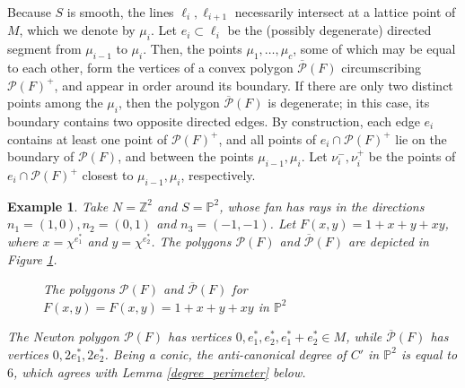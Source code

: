 \documentclass[12pt]{amsart}
\def\Z{\mathbb{Z}}
\def\P{\mathbb{P}}
\def\cP{\mathcal{P}}
\newtheorem{example}[definition]{Example}
\begin{document}
   Because $S$ is smooth, the lines $\ell_i,\ell_{i+1}$ necessarily intersect at a lattice point of $M$, which we denote by $\mu_i$. Let $e_i\subset \ell_i$ be the (possibly degenerate) directed segment from $\mu_{i-1}$ to $\mu_i$. Then, the points $\mu_1,\ldots,\mu_c$, some of which may be equal to each other, form the vertices of a convex polygon $\overline{\cP}(F)$ circumscribing $\cP(F)^+$, and appear in order around its boundary. If there are only two distinct points among the $\mu_i$, then the polygon $\overline{\cP}(F)$ is degenerate; in this case, its boundary contains two opposite directed edges. By construction, each edge $e_i$ contains at least one point of $\cP(F)^+$, and all points of $e_i\cap \cP(F)^+$ lie on the boundary of $\cP(F)$, and between the points $\mu_{i-1},\mu_i$. Let $\nu^{-}_{i},\nu^{+}_{i}$ be the points of $e_i\cap \cP(F)^+$ closest to $\mu_{i-1},\mu_i$, respectively.

\begin{example}
    Take $N= \Z^2$ and $S= \P^2$, whose fan has rays in the directions $n_1=(1,0),n_2=(0,1)$ and $n_3=(-1,-1)$. Let $F(x,y)=1+x+y+xy$, where $x=\chi^{e_1^{*}}$ and $y=\chi^{e_2^{*}}$. The polygons $\cP(F)$ and $\overline{\cP}(F)$ are depicted in Figure \ref{fig: example 1}.

    \begin{figure}[H]
    \begin{center}
    \caption{The polygons $\cP(F)$ and $\overline{\cP}(F)$ for $F(x,y)=F(x,y)=1+x+y+xy$ in $\P^2$ }\label{fig: example 1}
    \end{center}
    \end{figure}
    The Newton polygon $\cP(F)$ has vertices $0,e_1^{*},e_2^{*},e_1^{*}+e_2^{*}\in M$, while $\overline{\cP}(F)$ has vertices $0,2e_1^{*},2e_2^{*}$. Being a conic, the anti-canonical degree of $C'$ in $\P^2$ is equal to $6$, which agrees with Lemma \ref{degree_perimeter} below.
\end{example}
\end{document}
